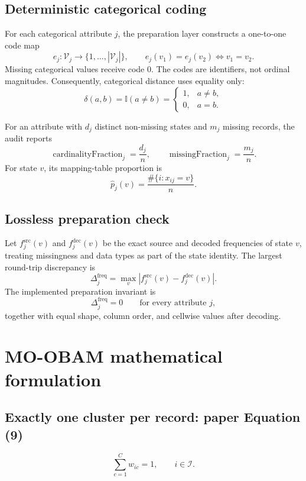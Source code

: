 \documentclass[11pt,a4paper]{article}
\newcommand{\I}{\mathbb{I}}
\newcommand{\card}[1]{\left\lvert #1\right\rvert}
\begin{document}
\subsection{Deterministic categorical coding}

For each categorical attribute $j$, the preparation layer constructs a
one-to-one code map
\[
e_j:\mathcal V_j\longrightarrow\{1,\ldots,\card{\mathcal V_j}\},
\qquad e_j(v_1)=e_j(v_2)\iff v_1=v_2.
\]
Missing categorical values receive code $0$.  The codes are identifiers, not
ordinal magnitudes.  Consequently, categorical distance uses equality only:
\[
\delta(a,b)=\I(a\ne b)=
\begin{cases}
1,&a\ne b,\\
0,&a=b.
\end{cases}
\tag{1}
\]

For an attribute with $d_j$ distinct non-missing states and $m_j$ missing
records, the audit reports
\[
\operatorname{cardinalityFraction}_j=\frac{d_j}{n},
\qquad
\operatorname{missingFraction}_j=\frac{m_j}{n}.
\tag{2}
\]
For state $v$, its mapping-table proportion is
\[
\widehat p_j(v)=\frac{\#\{i:x_{ij}=v\}}{n}.
\tag{3}
\]

\subsection{Lossless preparation check}

Let $f_j^{\mathrm{src}}(v)$ and $f_j^{\mathrm{dec}}(v)$ be the exact
source and decoded frequencies of state $v$, treating missingness and data
types as part of the state identity.  The largest round-trip discrepancy is
\[
\Delta_j^{\mathrm{freq}}
=\max_v\left|f_j^{\mathrm{src}}(v)-f_j^{\mathrm{dec}}(v)\right|.
\tag{4}
\]
The implemented preparation invariant is
\[
\Delta_j^{\mathrm{freq}}=0\qquad\text{for every attribute }j,
\tag{5}
\]
together with equal shape, column order, and cellwise values after decoding.

\section{MO-OBAM mathematical formulation}

\subsection{Exactly one cluster per record: paper Equation (9)}

\begin{equation}
\sum_{c=1}^{C}w_{ic}=1,
\qquad i\in\mathcal I.
\tag{P9}
\end{equation}
\end{document}
